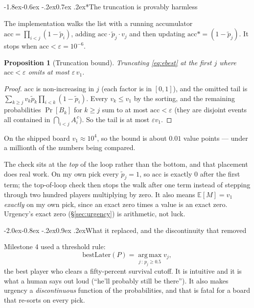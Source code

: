 \documentclass[10pt,a4paper]{article}
\makeatletter
\theoremstyle{plain}
\newtheorem{proposition}[theorem]{Proposition}
\theoremstyle{definition}
\theoremstyle{remark}
\renewcommand\subsection{\@startsection{subsection}{2}{\z@}%
  {-2.0ex\@plus -0.8ex \@minus -.2ex}{0.9ex \@plus .2ex}{\normalfont\large\bfseries}}
\renewcommand\subsubsection{\@startsection{subsubsection}{3}{\z@}%
  {-1.8ex\@plus -0.6ex \@minus -.2ex}{0.7ex \@plus .2ex}{\normalfont\normalsize\bfseries}}
\makeatother
\begin{document}
\subsubsection*{The truncation is provably harmless}

The implementation walks the list with a running accumulator
$\mathrm{acc} = \prod_{i<j}(1-\tilde p_i)$, adding
$\mathrm{acc}\cdot\tilde p_j \cdot v_j$ and then updating $\mathrm{acc} \mathrel{*{=}}
(1 - \tilde p_j)$. It stops when $\mathrm{acc} < \varepsilon = 10^{-6}$.

\begin{proposition}[Truncation bound]
Truncating \eqref{eq:ebest} at the first $j$ where $\mathrm{acc} < \varepsilon$ omits at
most $\varepsilon\, v_1$.
\end{proposition}

\begin{proof}
$\mathrm{acc}$ is non-increasing in $j$ (each factor is in $[0,1]$), and the omitted tail
is $\sum_{k \ge j} v_k \tilde p_k \prod_{i<k}(1-\tilde p_i)$. Every $v_k \le v_1$ by the
sorting, and the remaining probabilities $\Pr[B_k]$ for $k \ge j$ sum to at most
$\mathrm{acc} < \varepsilon$ (they are disjoint events all contained in
$\bigcap_{i<j}A_i^{\,c}$). So the tail is at most $\varepsilon v_1$.
\end{proof}

On the shipped board $v_1 \approx 10^4$, so the bound is about $0.01$ value points ---
under a millionth of the numbers being compared.

The check sits at the \emph{top} of the loop rather than the bottom, and that placement
does real work. On my own pick every $\tilde p_j = 1$, so $\mathrm{acc}$ is exactly $0$
after the first term; the top-of-loop check then stops the walk after one term instead
of stepping through two hundred players multiplying by zero. It also means
$\mathbb{E}[M] = v_1$ \emph{exactly} on my own pick, since an exact zero times a value is
an exact zero. Urgency's exact zero (\S\ref{sec:urgency}) is arithmetic, not luck.

\subsection{What it replaced, and the discontinuity that removed}

Milestone 4 used a threshold rule:
\[
\mathrm{bestLater}(P) = \operatorname*{arg\,max}_{j \,:\, p_j \ge 0.5} v_j,
\]
the best player who clears a fifty-percent survival cutoff. It is intuitive and it is
what a human says out loud (``he'll probably still be there''). It also makes urgency a
\emph{discontinuous} function of the probabilities, and that is fatal for a board that
re-sorts on every pick.
\end{document}
